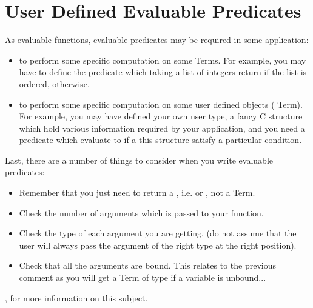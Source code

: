 \section{User Defined Evaluable Predicates}

As evaluable functions, evaluable predicates may be required in some
application:

\begin{itemize}

\item to perform some specific computation on some Terms. For example,
you may have to define the  predicate which taking a list
of integers return  if the list is ordered, 
otherwise.

\item to perform some specific computation on some user defined objects
( Term). For example, you may have defined your own user type, a
fancy C structure which hold various information required by your
application, and you need a predicate which evaluate to  if a
this structure satisfy a particular condition.

\end{itemize}

Last, there are a number of things to consider when you write evaluable
predicates:

\begin{itemize}

\item Remember that you just need to return a , i.e.
 or , not a Term.

\item Check the number of arguments which is passed to your function.

\item Check the type of each argument you are getting. (do not assume
that the user will always pass the argument of the right type at the
right position).

\item Check that all the arguments are bound. This relates to the previous
comment as you will get a Term of type  if a variable is
unbound...

\end{itemize}

, for more information
on this subject.

